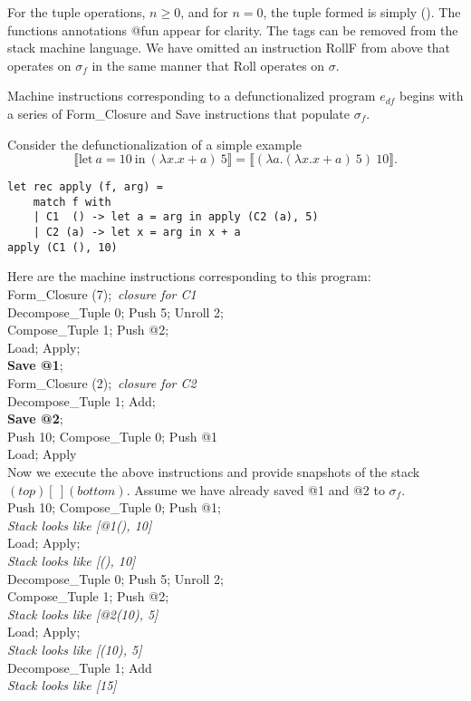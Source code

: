 \documentclass[11pt]{article}
\newcommand*{\br}[1]{\llbracket{#1}\rrbracket}
\begin{document}
For the tuple operations, $n \ge 0$, and for $n = 0$, the tuple formed is simply (). 
The functions annotations @fun appear for clarity. The tags can be removed from the stack machine language. We have omitted an instruction RollF from above that operates on $\sigma_f$ in the same manner that Roll operates on $\sigma$.

Machine instructions corresponding to a defunctionalized program $e_{df}$ begins with a series of Form\_Closure and Save instructions that populate $\sigma_f$. 

\break{}

Consider the defunctionalization of a simple example $$\br{\text{let}\ a = 10\ \text{in}\ (\lambda x.x+a)\ 5} = \br{(\lambda a.(\lambda x.x+a)\ 5)\ 10}.$$

\begin{lstlisting}
let rec apply (f, arg) = 
    match f with 
    | C1  () -> let a = arg in apply (C2 (a), 5)
    | C2 (a) -> let x = arg in x + a
apply (C1 (), 10)
\end{lstlisting}

Here are the machine instructions corresponding to this program:\\
Form\_Closure (7);\ \textit{closure for C1}\\
Decompose\_Tuple 0; Push 5; Unroll 2;\\
Compose\_Tuple 1; Push @2;\\
Load; Apply;\\
\textbf{Save @1};\\
Form\_Closure (2);\ \textit{closure for C2}\\
Decompose\_Tuple 1; Add;\\
\textbf{Save @2};\\
Push 10; Compose\_Tuple 0; Push @1\\
Load; Apply\\

Now we execute the above instructions and provide snapshots of the stack $(top)[\ ](bottom)$. Assume we have already saved @1 and @2 to $\sigma_f$.\\
Push 10; Compose\_Tuple 0; Push @1;\\
\textit{Stack looks like [@1(), 10]}\\
Load; Apply;\\
\textit{Stack looks like [(), 10]}\\
Decompose\_Tuple 0; Push 5; Unroll 2;\\
Compose\_Tuple 1; Push @2;\\
\textit{Stack looks like [@2(10), 5]}\\
Load; Apply;\\
\textit{Stack looks like [(10), 5]}\\
Decompose\_Tuple 1; Add\\
\textit{Stack looks like [15]}
\end{document}
